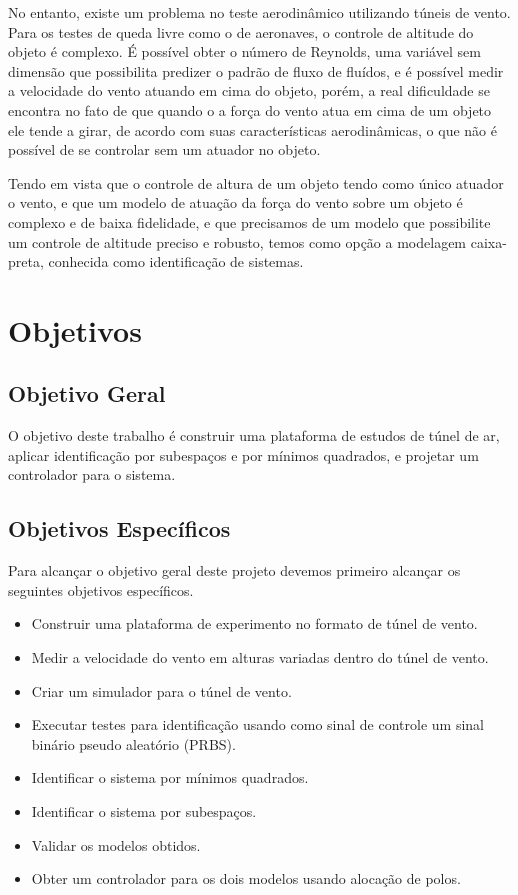 No entanto, existe um problema no teste aerodinâmico utilizando túneis de vento. Para os testes de queda livre como o de aeronaves, o controle de altitude do objeto é complexo. É possível obter o número de Reynolds, uma variável sem dimensão que possibilita predizer o padrão de fluxo de fluídos, e é possível medir a velocidade do vento atuando em cima do objeto, porém, a real dificuldade se encontra no fato de que quando o a força do vento atua em cima de um objeto ele tende a girar, \cite{briggs1959} de acordo com suas características aerodinâmicas, o que não é possível de se controlar sem um atuador no objeto.


Tendo em vista que o controle de altura de um objeto tendo como único atuador o vento, e que um modelo de atuação da força do vento sobre um objeto é complexo e de baixa fidelidade, e que precisamos de um modelo que possibilite um controle de altitude preciso e robusto, temos como opção a modelagem caixa-preta, conhecida como identificação de sistemas.


\section{Objetivos}

\subsection{Objetivo Geral}

O objetivo deste trabalho é construir uma plataforma de estudos de túnel de ar, aplicar identificação por subespaços e por mínimos quadrados, e projetar um controlador para o sistema.

\subsection{Objetivos Específicos}

Para alcançar o objetivo geral deste projeto devemos primeiro alcançar os seguintes objetivos específicos.

\begin{itemize}
	\item Construir uma plataforma de experimento no formato de túnel de vento.
	\item Medir a velocidade do vento em alturas variadas dentro do túnel de vento.
	\item Criar um simulador para o túnel de vento.
	\item Executar testes para identificação usando como sinal de controle um sinal binário pseudo aleatório (PRBS).
	\item Identificar o sistema por mínimos quadrados.
	\item Identificar o sistema por subespaços.
	\item Validar os modelos obtidos.
	\item Obter um controlador para os dois modelos usando alocação de polos.
\end{itemize}

